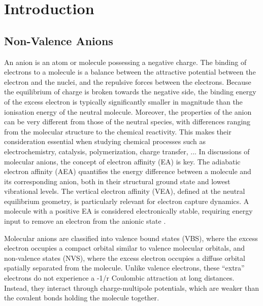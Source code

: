 \chapter{Introduction}\label{ch:introduction}

\section{Non-Valence Anions}
An anion is an atom or molecule possessing a negative charge\cite{simons2008molecular,simons2023molecular,simons2011theoretical,herbert2015quantum}. The binding of electrons to a molecule is a balance between the attractive potential between the electron and the nuclei, and the repulsive forces between the electrons. Because the equilibrium of charge is broken towards the negative side, the binding energy of the excess electron is typically significantly smaller in magnitude than the ionisation energy of the neutral molecule. Moreover, the properties of the anion can be very different from those of the neutral species, with differences ranging from the molecular structure to the chemical reactivity. This makes their consideration essential when studying chemical processes such as electrochemistry, catalysis, polymerization, charge transfer, ... In discussions of molecular anions, the concept of electron affinity (EA) is key. The adiabatic electron affinity (AEA) quantifies the energy difference between a molecule and its corresponding anion, both in their structural ground state and lowest vibrational levels. The vertical electron affinity (VEA), defined at the neutral equilibrium geometry, is particularly relevant for electron capture dynamics. A molecule with a positive EA is considered electronically stable, requiring energy input to remove an electron from the anionic state \cite{simons2008molecular}.

Molecular anions are classified into valence bound states (VBS), where the excess electron occupies a compact orbital similar to valence molecular orbitals, and non-valence states (NVS), where the excess electron occupies a diffuse orbital spatially separated from the molecule. Unlike valence electrons, these ``extra'' electrons do not experience a -1/r Coulombic attraction at long distances. Instead, they interact through charge-multipole potentials, which are weaker than the covalent bonds holding the molecule together\cite{simons2008molecular,herbert2015quantum}.

